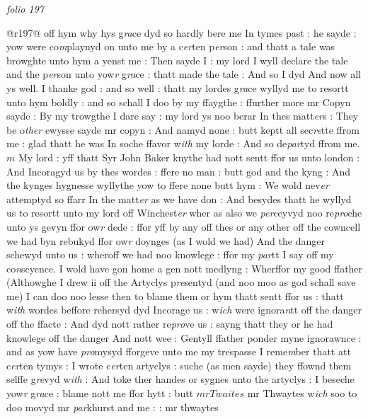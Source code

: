 \documentclass[12pt, a4paper]{book}
\begin{document}
\dotfill
					

\textit{folio 197}
      				
      				
      				@r197@ off hym why hys g\textit{ra}ce dyd so hardly bere me In tymes past : he sayde :  yow were co\textit{m}playnyd on unto me by a c\textit{er}ten p\textit{er}son : and thatt a tale was browghte unto hym a yenst me : Then sayde I : my lord I wyll declare the tale and the p\textit{er}son unto yow\textit{r }g\textit{ra}ce : thatt made the tale : And so I dyd And now all ys well. I thanke god : and so well : thatt my lordes g\textit{ra}ce wyllyd me to resortt unto hym boldly : and so schall I doo by my ffaygthe : ffurther more mr Copyn sayde : By my trowgthe I dare say : my lord ys noo berar In thes matt\textit{er}s : They be o\textit{ther} ewysse sayde mr copyn : And namyd none : butt keptt all sec\textit{re}tte ffrom me : glad thatt he was In soche ffavor w\textit{ith} my lorde : And so de\textit{par}tyd ffrom me.  $m$ My lord : yff thatt Syr John Baker knythe had nott sentt ffor us unto london : And Incoragyd us by thes wordes : ffere no man : butt god and the kyng : And the kynges hygnesse wyllythe yow to ffere none butt hym : We wold nev\textit{er} attemptyd so ffarr In the matt\textit{er} as we have don : And besydes thatt he wyllyd us to resortt unto my lord off Winchest\textit{er} wher as also we \textit{per}ceyvyd noo re\textit{pro}che unto ys gevyn ffor ow\textit{r} dede : ffor yff by any off thes or any other off the cowncell we had byn rebukyd ffor ow\textit{r} doynges (as I wold we had) And the  danger schewyd unto us : wheroff we had noo knowlege : ffor my \textit{par}tt I say off my co\textit{n}scyence. I wold have gon home a gen nott  medlyng : Wherffor my good ffather (Althowghe I drew ii off the  Artyclys p\textit{re}sentyd (and noo moo as god schall save me) I can doo  noo lesse then to blame them or hym thatt sentt ffor us : thatt w\textit{ith} wordes beffore rehersyd dyd Incorage us : w\textit{ich} were ignora\textit{n}tt off the danger off the ffacte : And dyd nott 
			rather re\textit{pro}ve us : sayng thatt they or he had knowlege off the danger And nott wee : Gentyll ffather ponder myne ignorawnce : and as yow have \textit{pro}mysyd fforgeve unto me my trespasse I reme\textit{m}ber thatt att c\textit{er}ten tymys : I wrote c\textit{er}ten artyclys : suche (as men sayde) they ffownd them selffe g\textit{re}vyd w\textit{ith} : And toke ther handes or sygnes unto the artyclys : I beseche yow\textit{r} g\textit{ra}ce : blame nott me ffor hytt : butt $mr Twaites$ mr Thwaytes w\textit{ich} soo to doo movyd mr \textit{par}khurst and me : : mr thwaytes
      				
\end{document}
